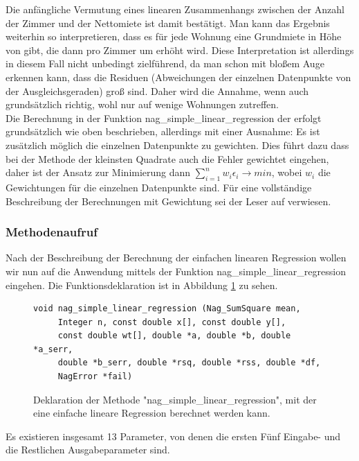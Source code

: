 Die anfängliche Vermutung eines linearen Zusammenhangs zwischen der Anzahl der Zimmer und der Nettomiete ist damit bestätigt.
Man kann das Ergebnis weiterhin so interpretieren, dass es für jede Wohnung eine Grundmiete in Höhe von  gibt, die dann pro Zimmer um  erhöht wird.
Diese Interpretation ist allerdings in diesem Fall nicht unbedingt zielführend, da man schon mit bloßem Auge erkennen kann, dass die Residuen (Abweichungen der einzelnen Datenpunkte von der Ausgleichsgeraden) groß sind.
Daher wird die Annahme, wenn auch grundsätzlich richtig, wohl nur auf wenige Wohnungen zutreffen.
\\

Die Berechnung in der Funktion nag\_simple\_linear\_regression der \naglib erfolgt grundsätzlich wie oben beschrieben, allerdings mit einer Ausnahme: Es ist zusätzlich möglich die einzelnen Datenpunkte zu gewichten.
Dies führt dazu dass bei der Methode der kleinsten Quadrate auch die Fehler gewichtet eingehen, daher ist der Ansatz zur Minimierung dann $\sum\limits_{i=1}^{n}w_i\epsilon_i \rightarrow min$, wobei $w_i$ die Gewichtungen für die einzelnen Datenpunkte sind.
Für eine vollständige Beschreibung der Berechnungen mit Gewichtung sei der Leser auf \cite{nag:simple_regression} verwiesen.

\subsubsection{Methodenaufruf}
\label{sec:sim_reg_anwendung}

Nach der Beschreibung der Berechnung der einfachen linearen Regression wollen wir nun auf die Anwendung mittels der Funktion nag\_simple\_linear\_regression eingehen.
Die Funktionsdeklaration ist in Abbildung \ref{fig:nag_simple_linear} zu sehen.
\begin{figure}[t]
  \centering
\begin{lstlisting}
void nag_simple_linear_regression (Nag_SumSquare mean, 
     Integer n, const double x[], const double y[], 
     const double wt[], double *a, double *b, double *a_serr, 
     double *b_serr, double *rsq, double *rss, double *df,
     NagError *fail)
\end{lstlisting}
  \caption{Deklaration der Methode "nag\_simple\_linear\_regression", mit der eine einfache lineare Regression berechnet werden kann. }
  \label{fig:nag_simple_linear}
\end{figure}
Es existieren insgesamt 13 Parameter, von denen die ersten Fünf Eingabe- und die Restlichen Ausgabeparameter sind.

